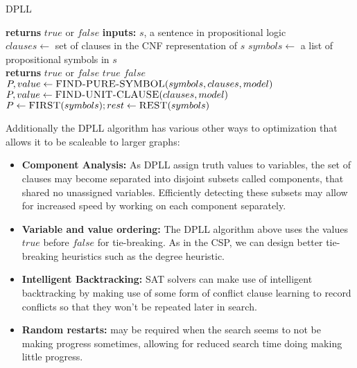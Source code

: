 \documentclass[12pt]{article}
\begin{document}
\begin{algorithm}
\caption{\textsc{DPLL}}\label{euclid}
\begin{algorithmic}[1]
 \textbf{returns} $true$ or $false$
\State \textbf{inputs:} $s$, a sentence in propositional logic\\

\State $clauses \leftarrow$ set of clauses in the CNF representation of $s$
\State $symbols \leftarrow$ a list of propositional symbols in $s$
\State {}
\EndProcedure \\

 \textbf{returns} $true$ or $false$
 \Return $true$ \EndIf
{} \Return $false$ \EndIf
\State $P, value \leftarrow \textsc{FIND-PURE-SYMBOL}(symbols, clauses, model)$
  \EndIf
\State $P, value \leftarrow \textsc{FIND-UNIT-CLAUSE}(clauses, model)$
  \EndIf
\State $P \leftarrow \textsc{FIRST}(symbols); rest \leftarrow \textsc{REST}(symbols)$
\State {}
\EndProcedure
\end{algorithmic}
\end{algorithm}

Additionally the DPLL algorithm has various other ways to optimization that allows it to be scaleable to larger graphs:

\begin{itemize}
\item \textbf{Component Analysis:} As DPLL assign truth values to variables, the set of clauses may become separated into disjoint subsets called components, that shared no unassigned variables. Efficiently detecting these subsets may allow for increased speed by working on each component separately.

\item \textbf{Variable and value ordering:} The DPLL algorithm above uses the values $true$ before $false$ for tie-breaking. As in the CSP, we can design better tie-breaking heuristics such as the degree heuristic.

\item \textbf{Intelligent Backtracking:} SAT solvers can make use of intelligent backtracking by making use of some form of conflict clause learning to record conflicts so that they won't be repeated later in search.

\item \textbf{Random restarts:} may be required when the search seems to not be making progress sometimes, allowing for reduced search time doing making little progress.
\end{itemize}
\end{document}
